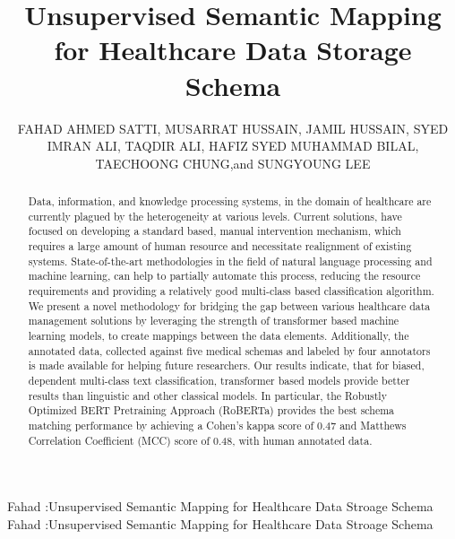 \documentclass{ieeeaccess}
\begin{document}

\title{Unsupervised Semantic Mapping for Healthcare Data Storage Schema}

\author{ \uppercase{Fahad Ahmed Satti},
	\uppercase{Musarrat Hussain},
	\uppercase{Jamil Hussain},
	\uppercase{Syed Imran Ali}, %
	\uppercase{Taqdir Ali},
	\uppercase{Hafiz Syed Muhammad Bilal},
	\uppercase{TaeChoong Chung},and  \uppercase {Sungyoung Lee}
	}
\address[1]{Department of Computer Science and Engineering, Kyung Hee University, Seocheon-dong, Giheung-gu South Korea (e-mail: \{fahad.satti, musarrat.hussain, imran.ali, bilalrizvi, sylee\}@oslab.khu.ac.kr,  tcchung@khu.ac.kr)}
\address[2]{National Univeristy of Sciences and Technology, School of Electrical Engineering and Computer Science NUST-SEECS, Islamabad, Pakistan (e-mail: \{fahad.satti, bilal.ali\}@seecs.edu.pk)}
\address[3]{Department of Data Science, Sejong University, Seoul, South Korea (e-mail: jamil@sejong.ac.kr)}
\tfootnote{}



\markboth
{Fahad \headeretal:Unsupervised Semantic Mapping for Healthcare Data Stroage Schema}
{Fahad \headeretal:Unsupervised Semantic Mapping for Healthcare Data Stroage Schema}



\begin{abstract}
Data, information, and knowledge processing systems, in the domain of healthcare are currently plagued by the heterogeneity at various levels. Current solutions, have focused on developing a standard based, manual intervention mechanism, which requires a large amount of human resource and necessitate realignment of existing systems. State-of-the-art methodologies in the field of natural language processing and machine learning, can help to partially automate this process, reducing the resource requirements and providing a relatively good multi-class based classification algorithm. We present a novel methodology for bridging the gap between various healthcare data management solutions by leveraging the strength of transformer based machine learning models, to create mappings between the data elements. Additionally, the annotated data, collected against five medical schemas and labeled by four annotators is made available for helping future researchers. Our results indicate, that for biased, dependent multi-class text classification, transformer based models provide better results than linguistic and other classical models. In particular, the Robustly Optimized BERT Pretraining Approach (RoBERTa) provides the best schema matching performance by achieving a Cohen's kappa score of 0.47 and Matthews Correlation Coefficient (MCC) score of 0.48, with human annotated data.
\end{abstract}
\end{document}
